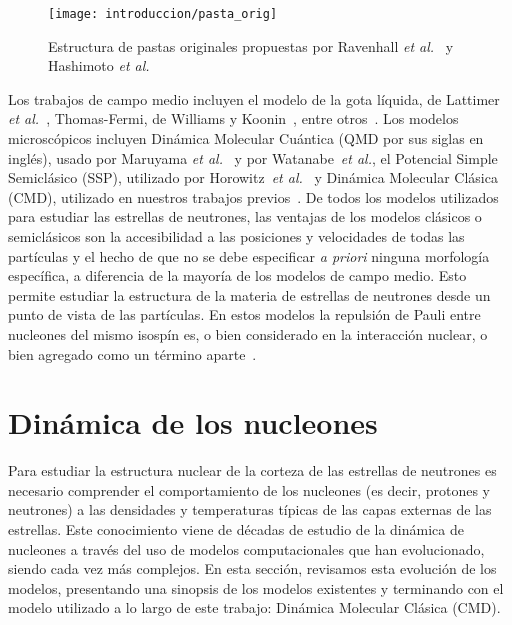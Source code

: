 \begin{figure}[h]
  \centering
  \texttt{[image: introduccion/pasta\_orig]}
  \caption{Estructura de pastas originales propuestas por Ravenhall \emph{et al.}~\cite{ravenhall_structure_1983} y Hashimoto \emph{et al.}~\cite{hashimoto_shape_1984}}
\label{fig:esquema}
\end{figure}

Los trabajos de campo medio incluyen el modelo de la gota líquida, de Lattimer \emph{et al.}~\cite{page_minimal_2004}, Thomas-Fermi, de Williams y Koonin~\cite{williams_sub-saturation_1985}, entre otros~\cite{oyamatsu_nuclear_1993, lorenz_neutron_1993, cheng_properties_1997, watanabe_thermodynamic_2000, watanabe_electron_2003, nakazato_gyroid_2009}.
Los modelos microscópicos incluyen Dinámica Molecular Cuántica (QMD por sus siglas en inglés), usado por Maruyama \emph{et al.}~\cite{maruyama_quantum_1998, kido_md_2000} y por Watanabe~\emph{et al.}\cite{watanabe_structure_2003}, el Potencial Simple Semiclásico (SSP), utilizado por Horowitz~\emph{et al.}~\cite{horowitz_nonuniform_2004} y Dinámica Molecular Clásica (CMD), utilizado en nuestros trabajos previos~\cite{dorso_topological_2012}.
De todos los modelos utilizados para estudiar las estrellas de neutrones, las ventajas de los modelos clásicos o semiclásicos son la accesibilidad a las posiciones y velocidades de todas las partículas y el hecho de que no se debe especificar \emph{a priori} ninguna morfología específica, a diferencia de la mayoría de los modelos de campo medio.
Esto permite estudiar la estructura de la materia de estrellas de neutrones desde un punto de vista de las partículas.
En estos modelos la repulsión de Pauli entre nucleones del mismo isospín es, o bien considerado en la interacción nuclear, o bien agregado como un término aparte~\cite{dorso_classical_1988}.

\section{Dinámica de los nucleones}\label{sc:nucleon}
Para estudiar la estructura nuclear de la corteza de las estrellas de neutrones es necesario comprender el comportamiento de los nucleones (es decir, protones y neutrones) a las densidades y temperaturas típicas de las capas externas de las estrellas.
Este conocimiento viene de décadas de estudio de la dinámica de nucleones a través del uso de modelos computacionales que han evolucionado, siendo cada vez más complejos.
En esta sección, revisamos esta evolución de los modelos, presentando una sinopsis de los modelos existentes y terminando con el modelo utilizado a lo largo de este trabajo: Dinámica Molecular Clásica (CMD).

